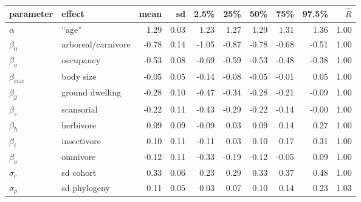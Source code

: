\documentclass{article}
\begin{document}
\begin{table}[c]
  \centering
  \begin{tabular}{ l l r r r r r r r r }
    parameter & effect & mean & sd & 2.5\% & 25\% & 50\% & 75\% & 97.5\% & \(\hat{R}\) \\ 
    \hline
    \(\alpha\) & ``age'' & 1.29 & 0.03 & 1.23 & 1.27 & 1.29 & 1.31 & 1.36 & 1.00 \\ 
    \hline
    \(\beta_{0}\) & arboreal/carnivore & -0.78 & 0.14 & -1.05 & -0.87 & -0.78 & -0.68 & -0.51 & 1.00 \\ 
    \(\beta_{o}\) & occupancy & -0.53 & 0.08 & -0.69 & -0.59 & -0.53 & -0.48 & -0.38 & 1.00 \\ 
    \(\beta_{size}\) & body size & -0.05 & 0.05 & -0.14 & -0.08 & -0.05 & -0.01 & 0.05 & 1.00 \\ 
    \(\beta_{g}\) & ground dwelling & -0.28 & 0.10 & -0.47 & -0.34 & -0.28 & -0.21 & -0.09 & 1.00 \\ 
    \(\beta_{s}\) & scansorial & -0.22 & 0.11 & -0.43 & -0.29 & -0.22 & -0.14 & -0.00 & 1.00 \\ 
    \(\beta_{h}\) & herbivore & 0.09 & 0.09 & -0.09 & 0.03 & 0.09 & 0.14 & 0.27 & 1.00 \\ 
    \(\beta_{i}\) & insectivore & 0.10 & 0.11 & -0.11 & 0.03 & 0.10 & 0.17 & 0.31 & 1.00 \\ 
    \(\beta_{o}\) & omnivore & -0.12 & 0.11 & -0.33 & -0.19 & -0.12 & -0.05 & 0.09 & 1.00 \\ 
    \hline
    \(\sigma_{c}\) & sd cohort & 0.33 & 0.06 & 0.23 & 0.29 & 0.33 & 0.37 & 0.48 & 1.00 \\ 
    \(\sigma_{p}\) & sd phylogeny & 0.11 & 0.05 & 0.03 & 0.07 & 0.10 & 0.14 & 0.23 & 1.03 \\ 
    \hline
  \end{tabular}
\end{table}
\end{document}

